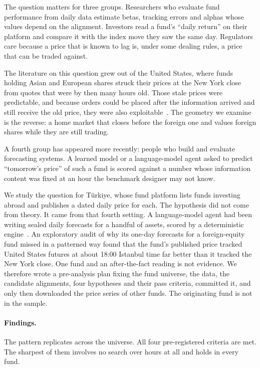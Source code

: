 \documentclass[11pt,a4paper]{article}
\begin{document}
The question matters for three groups. Researchers who evaluate fund
performance from daily data estimate betas, tracking errors and alphas whose
values depend on the alignment. Investors read a fund's ``daily return'' on
their platform and compare it with the index move they saw the same day.
Regulators care because a price that is known to lag is, under some dealing
rules, a price that can be traded against.

The literature on this question grew out of the United States, where funds
holding Asian and European shares struck their prices at the New York close
from quotes that were by then many hours old. Those stale prices were
predictable, and because orders could be placed after the information arrived
and still receive the old price, they were also
exploitable~\cite{bhargava1998exploiting,chalmers2001perils,goetzmann2001daytrading,boudoukh2002stale,zitzewitz2003cares}.
The geometry we examine is the reverse: a home market that closes before the
foreign one and values foreign shares while they are still trading.

A fourth group has appeared more recently: people who build and evaluate
forecasting systems. A learned model or a language-model agent asked to
predict ``tomorrow's price'' of such a fund is scored against a number whose
information content was fixed at an hour the benchmark designer may not know.

We study the question for T\"urkiye, whose fund platform lists funds investing
abroad and publishes a dated daily price for each. The hypothesis did not come
from theory. It came from that fourth setting. A language-model agent had been
writing sealed daily forecasts for a handful of assets, scored by a
deterministic engine~\cite{ciftler2026ledger}. An exploratory audit of why its
one-day forecasts for a foreign-equity fund missed in a patterned way found
that the fund's published price tracked United States futures at about 18:00
Istanbul time far better than it tracked the New York close. One fund and an
after-the-fact reading is not evidence. We therefore wrote a pre-analysis plan
fixing the fund universe, the data, the candidate alignments, four hypotheses
and their pass criteria, committed it, and only then downloaded the price
series of \NFunds{} other funds. The originating fund is not in the sample.

\paragraph{Findings.} The pattern replicates across the universe. All four
pre-registered criteria are met. The sharpest of them involves no search over
hours at all and holds in every fund.
\end{document}
